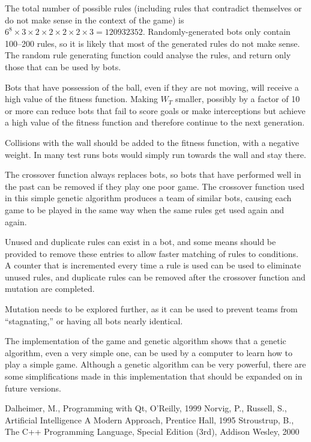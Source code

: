 \documentclass[%
        compressed,
        notitlepage,
        narroweqnarray,
        inline,
        ]{ieee}
\begin{document}
The total number of possible rules (including rules that contradict
themselves or do not make sense in the context of the game) is
$6^8 \times 3 \times 2 \times 2 \times 2 \times 2 \times 3 = 120932352$.
Randomly-generated bots only contain 100--200 rules, so it is likely that
most of the generated rules do not make sense. The random rule generating
function could analyse the rules, and return only those that can be used by
bots.

Bots that have possession of the ball, even if they are not moving, will
receive a high value of the fitness function. Making $W_T$ smaller, possibly by a
factor of 10 or more can reduce bots that fail to score goals or make
interceptions but achieve a high value of the fitness function and therefore
continue to the next generation.

Collisions with the wall should be added to the fitness function, with a
negative weight. In many test runs bots would simply run towards the wall
and stay there.

The crossover function always replaces bots, so bots that have performed
well in the past can be removed if they play one poor game. The crossover
function used in this simple genetic algorithm produces a team of similar
bots, causing each game to be played in the same way when the same rules get
used again and again.

Unused and duplicate rules can exist in a bot, and some means should be
provided to remove these entries to allow faster matching of rules to
conditions. A counter that is incremented every time a rule is used can be
used to eliminate unused rules, and duplicate rules can be removed after the
crossover function and mutation are completed.

Mutation needs to be explored further, as it can be used to prevent teams
from ``stagnating,'' or having all bots nearly identical.

The implementation of the game and genetic algorithm shows that a genetic
algorithm, even a very simple one, can be used by a computer to learn how to
play a simple game. Although a genetic algorithm can be very powerful, there
are some simplifications made in this implementation that should be
expanded on in future versions.


\begin{thebibliography}{1}
Dalheimer, M., Programming with Qt, O'Reilly, 1999
Norvig, P., Russell, S., Artificial Intelligence A Modern Approach,
Prentice Hall, 1995
Stroustrup, B., The C++ Programming Language, Special Edition (3rd),
Addison Wesley, 2000\end{thebibliography}
\end{document}
